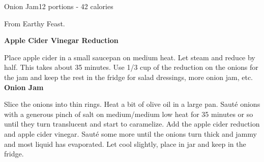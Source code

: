 \begin{recipe}{Onion Jam}{12 portions - 42 calories}{}

\freeform From Earthy Feast.


\textbf{Apple Cider Vinegar Reduction}

Place apple cider in a small saucepan on medium heat. Let steam and reduce by half. This takes about 35 minutes. Use 1/3 cup of the reduction on the onions for the jam and keep the rest in the fridge for salad dressings, more onion jam, etc.\\

\textbf{Onion Jam}

Slice the onions into thin rings. Heat a bit of olive oil in a large pan. Sauté onions with a generous pinch of salt on medium/medium low heat for 35 minutes or so until they turn translucent and start to caramelize. Add the apple cider reduction and apple cider vinegar. Sauté some more until the onions turn thick and jammy and most liquid has evaporated. Let cool slightly, place in jar and keep in the fridge.

\end{recipe}